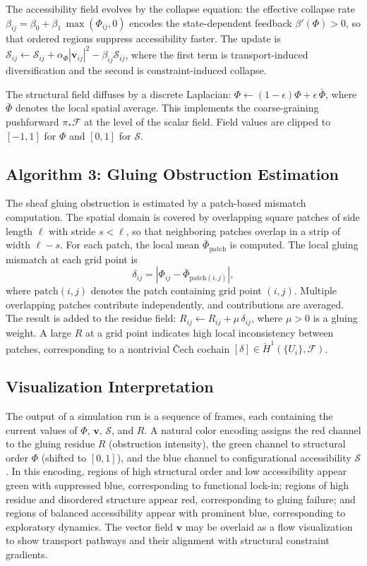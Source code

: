 \documentclass[11pt, a4paper, twocolumn]{article}
\newcommand{\Sfield}{\mathcal{S}}
\begin{document}
{The accessibility field evolves by the collapse equation: the effective
collapse rate $\beta_{ij} = \beta_0 + \beta_1\,\max(\Phi_{ij},0)$ encodes the
state-dependent feedback $\beta'(\Phi) > 0$, so that ordered regions suppress
accessibility faster. The update is
$\Sfield_{ij} \leftarrow \Sfield_{ij} + \alpha_\Phi |\mathbf{v}_{ij}|^2 -
\beta_{ij}\Sfield_{ij}$, where the first term is transport-induced
diversification and the second is constraint-induced collapse.

The structural field diffuses by a discrete Laplacian:
$\Phi \leftarrow (1-\epsilon)\Phi + \epsilon \,\bar\Phi$, where $\bar\Phi$
denotes the local spatial average. This implements the coarse-graining pushforward
$\pi_*\mathcal{F}$ at the level of the scalar field. Field values are clipped to
$[-1,1]$ for $\Phi$ and $[0,1]$ for $\Sfield$.

\subsection{Algorithm 3: Gluing Obstruction Estimation}

The sheaf gluing obstruction is estimated by a patch-based mismatch computation.
The spatial domain is covered by overlapping square patches of side length $\ell$
with stride $s < \ell$, so that neighboring patches overlap in a strip of width
$\ell - s$. For each patch, the local mean $\bar\Phi_{\mathrm{patch}}$ is
computed. The local gluing mismatch at each grid point is
\[
    \delta_{ij}
    =
    |\Phi_{ij} - \bar\Phi_{\mathrm{patch}(i,j)}|,
\]
where $\mathrm{patch}(i,j)$ denotes the patch containing grid point $(i,j)$.
Multiple overlapping patches contribute independently, and contributions are
averaged. The result is added to the residue field:
$R_{ij} \leftarrow R_{ij} + \mu\,\delta_{ij}$, where $\mu > 0$ is a gluing
weight. A large $R$ at a grid point indicates high local inconsistency between
patches, corresponding to a nontrivial \v{C}ech cochain
$[\delta] \in \check{H}^1(\{U_i\},\mathcal{F})$.

\subsection{Visualization Interpretation}

The output of a simulation run is a sequence of frames, each containing the
current values of $\Phi$, $\mathbf{v}$, $\Sfield$, and $R$. A natural
color encoding assigns the red channel to the gluing residue $R$ (obstruction
intensity), the green channel to structural order $\Phi$ (shifted to $[0,1]$),
and the blue channel to configurational accessibility $\Sfield$. In this
encoding, regions of high structural order and low accessibility appear green
with suppressed blue, corresponding to functional lock-in; regions of high
residue and disordered structure appear red, corresponding to gluing failure;
and regions of balanced accessibility appear with prominent blue, corresponding
to exploratory dynamics. The vector field $\mathbf{v}$ may be overlaid as a
flow visualization to show transport pathways and their alignment with
structural constraint gradients.

}
\end{document}
